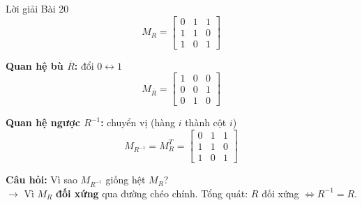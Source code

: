 \documentclass[12pt,a4paper]{article}
\begin{document}
\begin{baitap}{Lời giải Bài 20}
\[
  M_R = \begin{bmatrix} 0 & 1 & 1 \\ 1 & 1 & 0 \\ 1 & 0 & 1 \end{bmatrix}
\]
\noindent
\begin{minipage}[t]{0.47\textwidth}
\centering
\textbf{Quan hệ bù $\overline{R}$:} đổi $0 \leftrightarrow 1$
\[
  M_{\overline{R}} = \begin{bmatrix} 1 & 0 & 0 \\ 0 & 0 & 1 \\ 0 & 1 & 0 \end{bmatrix}
\]
\end{minipage}
\hfill
\begin{minipage}[t]{0.50\textwidth}
\centering
\textbf{Quan hệ ngược $R^{-1}$:} chuyển vị (hàng $i$ thành cột $i$)
\[
  M_{R^{-1}} = M_R^T = \begin{bmatrix} 0 & 1 & 1 \\ 1 & 1 & 0 \\ 1 & 0 & 1 \end{bmatrix}
\]
\end{minipage}

\textbf{Câu hỏi:} Vì sao $M_{R^{-1}}$ giống hệt $M_R$?\\
$\rightarrow$ Vì $M_R$ \textbf{đối xứng} qua đường chéo chính. Tổng quát: $R$ đối xứng $\iff R^{-1} = R$.
\end{baitap}
\end{document}
